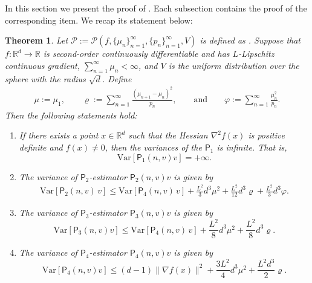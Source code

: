 \documentclass{article}
\newcommand{\Var}{\mathrm{Var}}
\newcommand{\RR}{\mathbb{R}}
\theoremstyle{definition}
\theoremstyle{plain}
\newtheorem{theorem}[definition]{Theorem}
\theoremstyle{remark}
\newcommand{\sfP}{\mathsf{P}}
\begin{document}
In this section we present the proof of . Each subsection contains the proof of the corresponding item. We recap its statement below:
\begin{theorem}\label{thm:variance-appendix} 
Let $\mathscr{P}:=\mathscr{P}(f, \{ \mu_n\}_{n=1}^\infty, \{ p_n\}_{n=1}^\infty,V)$ is defined as . Suppose that $f:\RR^d \to \RR$ is second-order continuously differentiable and has $L$-Lipschitz continuous gradient, $\sum_{n=1}^\infty \mu_n < \infty$, and $V$ is the uniform distribution over the  sphere with the radius $\sqrt{d}$. Define 
\begin{align*}
    \mu:=\mu_1, \qquad\varrho:= \sum_{n=1}^\infty \frac{(\mu_{n+1} - \mu_{n})^2}{p_n}, \qquad \text{and} \qquad \varphi:=\sum_{n=1}^\infty  \frac{\mu_{n}^2}{p_n}.
\end{align*}
Then the following statements hold:
    \begin{enumerate}[label=(\alph*)]
        \item If there exists a point $x\in \RR^d$ such that the Hessian $\nabla^2 f(x)$ is positive definite and $f(x)\neq 0$, then the variances of the $\sfP_1$ is infinite. That is,
        $$\Var[\sfP_1(n,v) v] = + \infty.$$
        \item  The variance of $\sfP_2$-estimator $\sfP_2(n,v) v$ is given by
\begin{align*}
    \Var[\sfP_2(n,v) \, v ]  
    \leq  \Var[\sfP_4(n,v)\, v] + \frac{L^2 }{3} d^3\mu^2 + \frac{L^2}{12}  d^3  \varrho  + \frac{L^2}{3} d^3   \varphi.
\end{align*}
        \item  The variance of $\sfP_3$-estimator $\sfP_3(n,v) v$ is given by
        $$\Var[\sfP_3(n,v) v] \leq \Var[\sfP_4(n,v)\, v] + \frac{L^2 }{8} d^3\mu^2 + \frac{L^2}{8}  d^3 \varrho. $$ 
        \item The variance of $\sfP_4$-estimator $\sfP_4(n,v) v$ is given by
        $$\Var[\sfP_4(n,v) v] \leq  (d-1) \| \nabla f(x) \|^2 +  \frac{3L^2}{4} d^3 \mu^2  +  \frac{L^2 d^3}{2}  \varrho.$$
    \end{enumerate}
\end{theorem}
\end{document}
